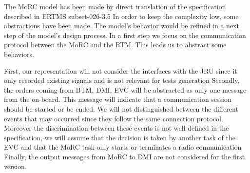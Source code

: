 \label{subsec:abstaction}
The MoRC model has been made by direct translation of the specification described
in ERTMS subset-026-3.5 In order to keep the complexity low, some
abstractions have been made. The model's behavior would be refined in a next step
of the model's design process. In a first step we focus on the communication
protocol between the MoRC and the RTM. This leads us to abstract some behaviors.

First, our representation will not consider the interfaces with the JRU
since it only recorded existing signals and is not relevant for tests
generation
Secondly, the orders coming from BTM, DMI, EVC will be abstracted as only one message
from the on-board. This message will indicate that a communication session
should be started or be ended. We will not distinguished between the different
events that may occurred since they follow the same connection protocol. Moreover the discrimination
between these events is not well defined in the specification, we will assume
that the decision is taken by another task of the EVC and that the MoRC task only
 starts or terminates a radio communication
Finally, the output messages from MoRC to DMI are not considered for the first version.


